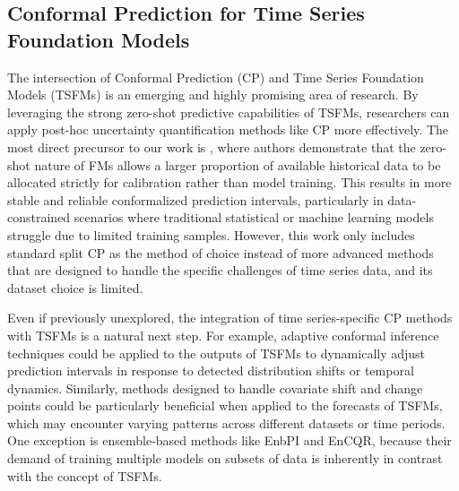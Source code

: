 \documentclass[12pt, a4paper]{article}
\begin{document}
\subsection{Conformal Prediction for Time Series Foundation Models}
The intersection of Conformal Prediction (CP) and Time Series Foundation Models (TSFMs) is an emerging and highly promising area of research. By leveraging the strong zero-shot predictive capabilities of TSFMs, researchers can apply post-hoc uncertainty quantification methods like CP more effectively. The most direct precursor to our work is \cite{ts-genai-cp}, where authors demonstrate that the zero-shot nature of FMs allows a larger proportion of available historical data to be allocated strictly for calibration rather than model training. This results in more stable and reliable conformalized prediction intervals, particularly in data-constrained scenarios where traditional statistical or machine learning models struggle due to limited training samples. However, this work only includes standard split CP as the method of choice instead of more advanced methods that are designed to handle the specific challenges of time series data, and its dataset choice is limited.

Even if previously unexplored, the integration of time series-specific CP methods with TSFMs is a natural next step. For example, adaptive conformal inference techniques could be applied to the outputs of TSFMs to dynamically adjust prediction intervals in response to detected distribution shifts or temporal dynamics. Similarly, methods designed to handle covariate shift and change points could be particularly beneficial when applied to the forecasts of TSFMs, which may encounter varying patterns across different datasets or time periods. One exception is ensemble-based methods like EnbPI and EnCQR, because their demand of training multiple models on subsets of data is inherently in contrast with the concept of TSFMs.

\end{document}

